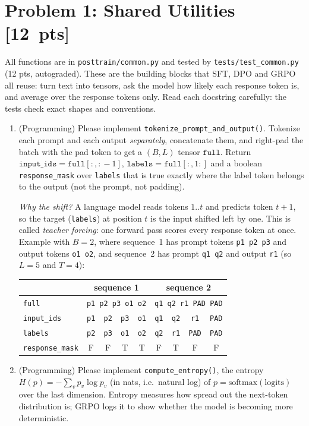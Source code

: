 \documentclass[11pt]{article}
\newcommand{\pts}[1]{\textnormal{[#1~pts]}}
\newcommand{\file}[1]{\texttt{#1}}
\begin{document}
\section*{Problem 1: Shared Utilities \pts{12}}
All functions are in \file{posttrain/common.py} and tested by \file{tests/test\_common.py} (12 pts, autograded).
These are the building blocks that SFT, DPO and GRPO all reuse: turn text into tensors, ask the model how likely
each response token is, and average over the response tokens only. Read each docstring carefully: the tests check
exact shapes and conventions.
\begin{enumerate}
  \item (Programming) Please implement \texttt{tokenize\_prompt\_and\_output()}. Tokenize each prompt and each
        output \emph{separately}, concatenate them, and right-pad the batch with the pad token to get a $(B, L)$
        tensor $\texttt{full}$. Return $\texttt{input\_ids} = \texttt{full}[:, :\!-1]$,
        $\texttt{labels} = \texttt{full}[:, 1:]$ and a boolean \texttt{response\_mask} over \texttt{labels} that
        is true exactly where the label token belongs to the output (not the prompt, not padding).

        \emph{Why the shift?} A language model reads tokens $1..t$ and predicts token $t{+}1$, so the target
        (\texttt{labels}) at position $t$ is the input shifted left by one. This is called \emph{teacher forcing}:
        one forward pass scores every response token at once. Example with $B=2$, where sequence~1 has prompt
        tokens \texttt{p1 p2 p3} and output tokens \texttt{o1 o2}, and sequence~2 has prompt \texttt{q1 q2} and
        output \texttt{r1} (so $L=5$ and $T=4$):
\begin{center}
\begin{tabular}{@{}l|cccc|cccc@{}}
\toprule
 & \multicolumn{4}{c|}{sequence 1} & \multicolumn{4}{c}{sequence 2} \\
\midrule
\texttt{full}           & \multicolumn{4}{c|}{\texttt{p1 p2 p3 o1 o2}} & \multicolumn{4}{c}{\texttt{q1 q2 r1 PAD PAD}} \\
\texttt{input\_ids}     & \texttt{p1} & \texttt{p2} & \texttt{p3} & \texttt{o1} & \texttt{q1} & \texttt{q2} & \texttt{r1} & \texttt{PAD} \\
\texttt{labels}         & \texttt{p2} & \texttt{p3} & \texttt{o1} & \texttt{o2} & \texttt{q2} & \texttt{r1} & \texttt{PAD} & \texttt{PAD} \\
\texttt{response\_mask} & F & F & T & T & F & T & F & F \\
\bottomrule
\end{tabular}
\end{center}
  \item (Programming) Please implement \texttt{compute\_entropy()}, the entropy
        $H(p) = -\sum_v p_v \log p_v$ (in nats, i.e.\ natural log) of $p=\mathrm{softmax}(\text{logits})$ over the
        last dimension. Entropy measures how spread out the next-token distribution is; GRPO logs it to show
        whether the model is becoming more deterministic.


\end{enumerate}
\end{document}
